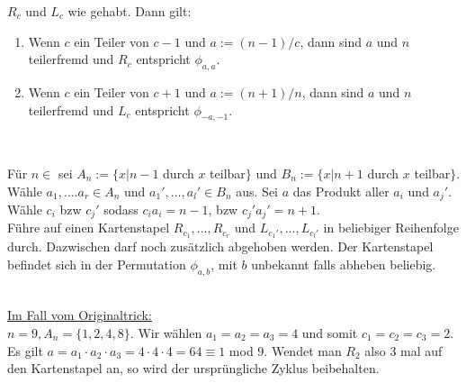 \documentclass[a4paper]{article}
\begin{document}
    \begin{satz}[5.2]
    $R_c$ und $L_c$ wie gehabt. Dann gilt:
    \begin{enumerate}
    \item Wenn $c$ ein Teiler von $c - 1$ und $a := (n - 1)/c$, dann sind $a$ und $n$ teilerfremd und $R_c$ entspricht $\phi_{a,a}$.
    \item Wenn $c$ ein Teiler von $c + 1$ und $a := (n + 1)/n$, dann sind $a$ und $n$ teilerfremd und $L_c$ entspricht $\phi_{-a,-1}$.
    \end{enumerate}
    \end{satz} \\
    
    \begin{lemma}[5.3]
    Für $n \in $  sei $A_n := \lbrace x \big\vert n-1$ durch $x$ teilbar$\rbrace$ und $B_n := \lbrace x \big\vert n+1$ durch $x$ teilbar$\rbrace$. \\
    Wähle $a_1, …. a_r \in A_n$ und $a_1', …, a_l' \in B_n$ aus. Sei $a$ das Produkt aller $a_i$ und $a_j'$. Wähle $c_i$ bzw $c_j'$ sodass $c_ia_i = n-1$, bzw $c_j'a_j' = n+1$. \\
    Führe auf einen Kartenstapel $R_{c_1}, …, R_{c_r}$ und $L_{c_1'}, …, L_{c_l'}$ in beliebiger Reihenfolge durch. Dazwischen darf noch zusätzlich abgehoben werden. Der Kartenstapel befindet sich in der Permutation $\phi_{a,b}$, mit $b$ unbekannt falls abheben beliebig.
    \end{lemma}

   \noindent {} \\
   
   \noindent \underline{Im Fall vom Originaltrick:} \\
   $n=9, A_n=\lbrace 1,2,4,8\rbrace$. Wir wählen $a_1 = a_2 = a_3 = 4$ und somit $c_1 = c_2 = c_3 = 2$. \\
   Es gilt $a = a_1 \cdot a_2 \cdot a_3 = 4 \cdot 4 \cdot 4 = 64 \equiv 1$ mod $9$. Wendet man $R_2$ also 3 mal auf den Kartenstapel an, so wird der ursprüngliche Zyklus beibehalten.
   
\end{document}
